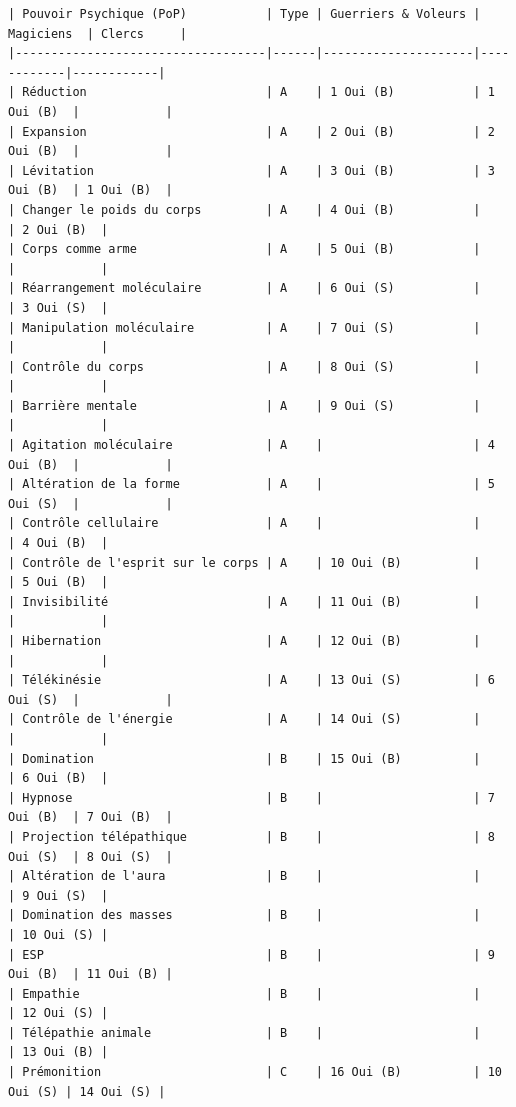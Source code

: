 \documentclass[11pt]{article}
\begin{document}
{\begin{verbatim}
| Pouvoir Psychique (PoP)           | Type | Guerriers & Voleurs | Magiciens  | Clercs     |
|-----------------------------------|------|---------------------|------------|------------|
| Réduction                         | A    | 1 Oui (B)           | 1 Oui (B)  |            |
| Expansion                         | A    | 2 Oui (B)           | 2 Oui (B)  |            |
| Lévitation                        | A    | 3 Oui (B)           | 3 Oui (B)  | 1 Oui (B)  |
| Changer le poids du corps         | A    | 4 Oui (B)           |            | 2 Oui (B)  |
| Corps comme arme                  | A    | 5 Oui (B)           |            |            |
| Réarrangement moléculaire         | A    | 6 Oui (S)           |            | 3 Oui (S)  |
| Manipulation moléculaire          | A    | 7 Oui (S)           |            |            |
| Contrôle du corps                 | A    | 8 Oui (S)           |            |            |
| Barrière mentale                  | A    | 9 Oui (S)           |            |            |
| Agitation moléculaire             | A    |                     | 4 Oui (B)  |            |
| Altération de la forme            | A    |                     | 5 Oui (S)  |            |
| Contrôle cellulaire               | A    |                     |            | 4 Oui (B)  |
| Contrôle de l'esprit sur le corps | A    | 10 Oui (B)          |            | 5 Oui (B)  |
| Invisibilité                      | A    | 11 Oui (B)          |            |            |
| Hibernation                       | A    | 12 Oui (B)          |            |            |
| Télékinésie                       | A    | 13 Oui (S)          | 6 Oui (S)  |            |
| Contrôle de l'énergie             | A    | 14 Oui (S)          |            |            |
| Domination                        | B    | 15 Oui (B)          |            | 6 Oui (B)  |
| Hypnose                           | B    |                     | 7 Oui (B)  | 7 Oui (B)  |
| Projection télépathique           | B    |                     | 8 Oui (S)  | 8 Oui (S)  |
| Altération de l'aura              | B    |                     |            | 9 Oui (S)  |
| Domination des masses             | B    |                     |            | 10 Oui (S) |
| ESP                               | B    |                     | 9 Oui (B)  | 11 Oui (B) |
| Empathie                          | B    |                     |            | 12 Oui (S) |
| Télépathie animale                | B    |                     |            | 13 Oui (B) |
| Prémonition                       | C    | 16 Oui (B)          | 10 Oui (S) | 14 Oui (S) |

\end{verbatim}}
\end{document}
